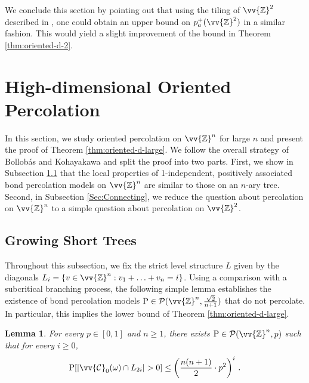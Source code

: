 \documentclass[11pt]{article}
\renewcommand{\P}{\mathrm{P}}
\newcommand{\Z}{\mathbb{Z}}
\DeclarePairedDelimiter{\abs}{\lvert}{\rvert}
\newtheorem{lemma}{Lemma}
\theoremstyle{remark}
\begin{document}
We conclude this section by pointing out that using the tiling of $\vv{\Z}^2$ described in \cite{durrett1992stochastic}, one could obtain an upper bound on $p^+_a(\vv{\Z}^2)$ in a similar fashion. This would yield a slight improvement of the bound in Theorem \ref{thm:oriented-d-2}. 


\section{High-dimensional Oriented Percolation}
\label{sec:high-dimensional-percolation}

In this section, we study oriented percolation on $\vv{\Z}^n$ for large $n$ and present the proof of Theorem \ref{thm:oriented-d-large}. We follow the overall strategy of Bollobás and Kohayakawa \cite{Bollobas1994} and split the proof into two parts. First, we show in Subsection \ref{Sec:ShortTrees} that the local properties of 1-independent, positively associated bond percolation models on $\vv{\Z}^n$ are similar to those on an $n$-ary tree. Second, in Subsection \ref{Sec:Connecting}, we reduce the question about percolation on $\vv{\Z}^n$ to a simple question about percolation on $\vv{\Z}^2$. 

\subsection{Growing Short Trees}\label{Sec:ShortTrees}

Throughout this subsection, we fix the strict level structure $L$ given by the diagonals $L_{i} = \{v \in \vv{\Z}^{n}: v_1 + \ldots + v_{n} = i\}$. 
Using a comparison with a subcritical branching process, the following simple lemma establishes the existence of bond percolation models $\P \in \mathcal{P}(\vv{\Z}^n, \frac{\sqrt{2}}{n+1})$ that do not percolate. In particular, this implies the lower bound of Theorem \ref{thm:oriented-d-large}.

\begin{lemma}\label{SubcriticalBranching}
    For every $p \in [0,1]$ and $n\ge 1$, there exists $\P \in \mathcal{P}(\vv{\Z}^n, p)$ such that for every $i\ge 0$,
    \begin{equation}
        \P[\abs{\vv{\mathcal{C}}_0(\omega) \cap L_{2i}} > 0] \le \left(\frac{n(n+1)}{2}\cdot p^2\right)^i\, . 
    \end{equation}
\end{lemma}
\end{document}
